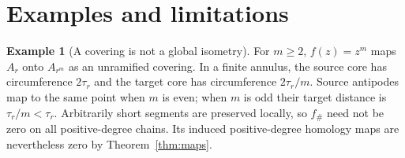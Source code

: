 \documentclass[12pt]{amsart}
\theoremstyle{definition}
\newtheorem{eg}[thm]{Example}
\theoremstyle{remark}
\numberwithin{equation}{section}
\begin{document}
\section{Examples and limitations}\label{sec:examples}
\begin{eg}[A covering is not a global isometry]\label{eg:power}
For $m\ge2$, $f(z)=z^m$ maps $A_r$ onto $A_{r^m}$ as an unramified covering. In a finite annulus, the source core has circumference $2\tau_r$ and the target core has circumference $2\tau_r/m$. Source antipodes map to the same point when $m$ is even; when $m$ is odd their target distance is $\tau_r/m<\tau_r$. Arbitrarily short segments are preserved locally, so $f_\#$ need not be zero on all positive-degree chains. Its induced positive-degree homology maps are nevertheless zero by Theorem~\ref{thm:maps}.
\end{eg}
\end{document}
